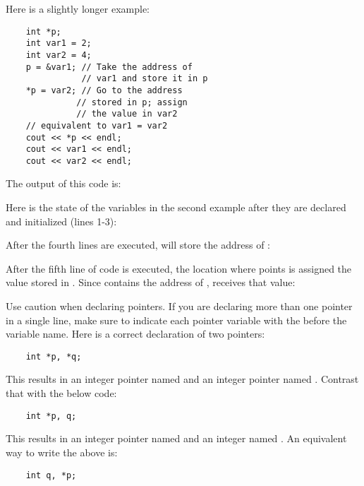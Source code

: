 \noindent {}

Here is a slightly longer example:

\begin{lstlisting}
	int *p;
	int var1 = 2;
	int var2 = 4;
	p = &var1; // Take the address of
	           // var1 and store it in p
	*p = var2; // Go to the address 
	          // stored in p; assign              
	          // the value in var2
	// equivalent to var1 = var2
	cout << *p << endl;
	cout << var1 << endl;
	cout << var2 << endl;
\end{lstlisting}

The output of this code is:

\noindent {}

\noindent {}

\noindent {}

Here is the state of the variables in the second example after they are declared and initialized (lines 1-3):


After the fourth lines are executed,  will store the address of :


After the fifth line of code is executed, the location where  points is assigned the value stored in .
Since  contains the address of ,  receives that value:


Use caution when declaring pointers.
If you are declaring more than one pointer in a single line, make sure to indicate each pointer variable with the \Code{*} before the variable name.  
Here is a correct declaration of two pointers:

\begin{lstlisting}
	int *p, *q;
\end{lstlisting}

This results in an integer pointer named  and an integer pointer named . 
Contrast that with the below code:

\begin{lstlisting}
	int *p, q;
\end{lstlisting}

This results in an integer pointer named  and an integer named . 
An equivalent way to write the above is:

\begin{lstlisting}
	int q, *p;
\end{lstlisting}

